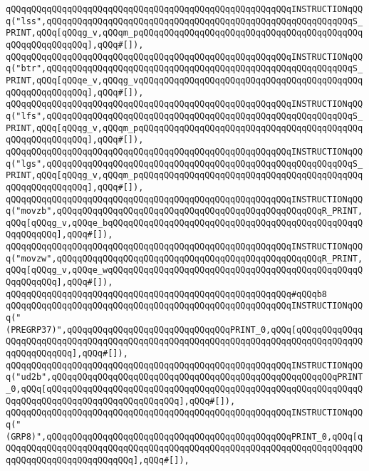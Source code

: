 \verb|qQQqqQQqqQQqqQQqqQQqqQQqqQQqqQQqqQQqqQQqqQQqqQQqqQQqqQQqINSTRUCTIONqQQq("lss",qQQqqQQqqQQqqQQqqQQqqQQqqQQqqQQqqQQqqQQqqQQqqQQqqQQqqQQqqQQqS_PRINT,qQQq[qQQqg_v,qQQqm_pqQQqqQQqqQQqqQQqqQQqqQQqqQQqqQQqqQQqqQQqqQQqqQQqqQQqqQQqqQQq],qQQq#[]),|\newline
\verb|qQQqqQQqqQQqqQQqqQQqqQQqqQQqqQQqqQQqqQQqqQQqqQQqqQQqqQQqINSTRUCTIONqQQq("btr",qQQqqQQqqQQqqQQqqQQqqQQqqQQqqQQqqQQqqQQqqQQqqQQqqQQqqQQqqQQqS_PRINT,qQQq[qQQqe_v,qQQqg_vqQQqqQQqqQQqqQQqqQQqqQQqqQQqqQQqqQQqqQQqqQQqqQQqqQQqqQQqqQQq],qQQq#[]),|\newline
\verb|qQQqqQQqqQQqqQQqqQQqqQQqqQQqqQQqqQQqqQQqqQQqqQQqqQQqqQQqINSTRUCTIONqQQq("lfs",qQQqqQQqqQQqqQQqqQQqqQQqqQQqqQQqqQQqqQQqqQQqqQQqqQQqqQQqqQQqS_PRINT,qQQq[qQQqg_v,qQQqm_pqQQqqQQqqQQqqQQqqQQqqQQqqQQqqQQqqQQqqQQqqQQqqQQqqQQqqQQqqQQq],qQQq#[]),|\newline
\verb|qQQqqQQqqQQqqQQqqQQqqQQqqQQqqQQqqQQqqQQqqQQqqQQqqQQqqQQqINSTRUCTIONqQQq("lgs",qQQqqQQqqQQqqQQqqQQqqQQqqQQqqQQqqQQqqQQqqQQqqQQqqQQqqQQqqQQqS_PRINT,qQQq[qQQqg_v,qQQqm_pqQQqqQQqqQQqqQQqqQQqqQQqqQQqqQQqqQQqqQQqqQQqqQQqqQQqqQQqqQQq],qQQq#[]),|\newline
\verb|qQQqqQQqqQQqqQQqqQQqqQQqqQQqqQQqqQQqqQQqqQQqqQQqqQQqqQQqINSTRUCTIONqQQq("movzb",qQQqqQQqqQQqqQQqqQQqqQQqqQQqqQQqqQQqqQQqqQQqqQQqqQQqR_PRINT,qQQq[qQQqg_v,qQQqe_bqQQqqQQqqQQqqQQqqQQqqQQqqQQqqQQqqQQqqQQqqQQqqQQqqQQqqQQqqQQq],qQQq#[]),|\newline
\verb|qQQqqQQqqQQqqQQqqQQqqQQqqQQqqQQqqQQqqQQqqQQqqQQqqQQqqQQqINSTRUCTIONqQQq("movzw",qQQqqQQqqQQqqQQqqQQqqQQqqQQqqQQqqQQqqQQqqQQqqQQqqQQqR_PRINT,qQQq[qQQqg_v,qQQqe_wqQQqqQQqqQQqqQQqqQQqqQQqqQQqqQQqqQQqqQQqqQQqqQQqqQQqqQQqqQQq],qQQq#[]),|\newline
\verb|qQQqqQQqqQQqqQQqqQQqqQQqqQQqqQQqqQQqqQQqqQQqqQQqqQQqqQQq#qQQqb8|\newline
\verb|qQQqqQQqqQQqqQQqqQQqqQQqqQQqqQQqqQQqqQQqqQQqqQQqqQQqqQQqINSTRUCTIONqQQq("(PREGRP37)",qQQqqQQqqQQqqQQqqQQqqQQqqQQqqQQqPRINT_0,qQQq[qQQqqQQqqQQqqQQqqQQqqQQqqQQqqQQqqQQqqQQqqQQqqQQqqQQqqQQqqQQqqQQqqQQqqQQqqQQqqQQqqQQqqQQqqQQqqQQq],qQQq#[]),|\newline
\verb|qQQqqQQqqQQqqQQqqQQqqQQqqQQqqQQqqQQqqQQqqQQqqQQqqQQqqQQqINSTRUCTIONqQQq("ud2b",qQQqqQQqqQQqqQQqqQQqqQQqqQQqqQQqqQQqqQQqqQQqqQQqqQQqqQQqPRINT_0,qQQq[qQQqqQQqqQQqqQQqqQQqqQQqqQQqqQQqqQQqqQQqqQQqqQQqqQQqqQQqqQQqqQQqqQQqqQQqqQQqqQQqqQQqqQQqqQQqqQQq],qQQq#[]),|\newline
\verb|qQQqqQQqqQQqqQQqqQQqqQQqqQQqqQQqqQQqqQQqqQQqqQQqqQQqqQQqINSTRUCTIONqQQq("(GRP8)",qQQqqQQqqQQqqQQqqQQqqQQqqQQqqQQqqQQqqQQqqQQqqQQqPRINT_0,qQQq[qQQqqQQqqQQqqQQqqQQqqQQqqQQqqQQqqQQqqQQqqQQqqQQqqQQqqQQqqQQqqQQqqQQqqQQqqQQqqQQqqQQqqQQqqQQqqQQq],qQQq#[]),|\newline
